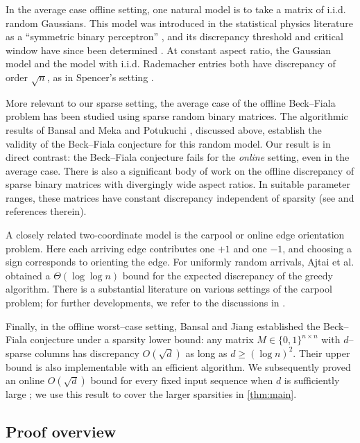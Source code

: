 \documentclass[reqno,english]{amsart}
\theoremstyle{definition}
\begin{document}
In the average case offline setting, one natural model is to take a matrix of i.i.d. random Gaussians. This model was introduced in the statistical physics literature as a ``symmetric binary perceptron'' \cite{APZ}, and its discrepancy threshold and critical window have since been determined \cite{ALS1,dja-crit,PX,ss}. At constant aspect ratio, the Gaussian model and the model with i.i.d. Rademacher entries both have discrepancy of order $\sqrt n$, as in Spencer's setting \cite{spencer1985six}.

More relevant to our sparse setting, the average case of the offline Beck--Fiala problem has been studied using sparse random binary matrices. The algorithmic results of Bansal and Meka \cite{bansal-meka} and Potukuchi \cite{potukuchi-spectral}, discussed above, establish the validity of the Beck--Fiala conjecture for this random model. Our result is in direct contrast: the Beck--Fiala conjecture fails for the {\it online} setting, even in the average case. There is also a significant body of work on the offline discrepancy of sparse binary matrices with divergingly wide aspect ratios. In suitable parameter ranges, these matrices have constant discrepancy independent of sparsity (see \cite{dja-jnw} and references therein).

A closely related two-coordinate model is the carpool or online edge orientation problem. Here each arriving edge contributes one $+1$ and one $-1$, and choosing a sign corresponds to orienting the edge. For uniformly random arrivals, Ajtai et al. \cite{ajtai-carpool} obtained a $\Theta(\log\log n)$ bound for the expected discrepancy of the greedy algorithm. There is a substantial literature on various settings of the carpool problem; for further developments, we refer to the discussions in \cite{gupta-carpool,optimal-online}.

Finally, in the offline worst--case setting, Bansal and Jiang \cite{bansal-jiang2,bansal-jiang1} established the Beck--Fiala conjecture under a sparsity lower bound: any matrix $M\in\{0,1\}^{n\times n}$ with $d$--sparse columns has discrepancy $O(\sqrt d)$ as long as $d\ge(\log n)^2$. Their upper bound is also implementable with an efficient algorithm. We subsequently proved an online $O(\sqrt d)$ bound for every fixed input sequence when $d$ is sufficiently large \cite{altschuler-tikhomirov-bf}; we use this result to cover the larger sparsities in \cref{thm:main}.

\subsection{Proof overview} 
\end{document}
